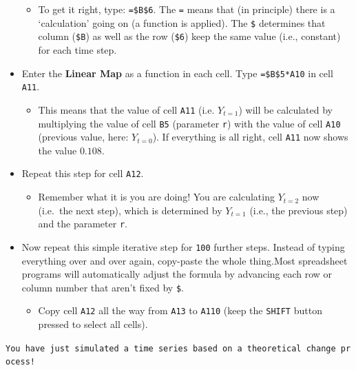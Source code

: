 \documentclass[]{book}
\providecommand{\tightlist}{%
  \setlength{\itemsep}{0pt}\setlength{\parskip}{0pt}}
\begin{document}
\begin{itemize}
  \begin{itemize}
  \tightlist
  \item
    To get it right, type: \texttt{=\$B\$6}. The \texttt{=} means that
    (in principle) there is a `calculation' going on (a function is
    applied). The \texttt{\$} determines that column (\texttt{\$B}) as
    well as the row (\texttt{\$6}) keep the same value (i.e., constant)
    for each time step.
  \end{itemize}
\item
  Enter the \textbf{Linear Map} as a function in each cell. Type
  \texttt{=\$B\$5*A10} in cell \texttt{A11}.

  \begin{itemize}
  \tightlist
  \item
    This means that the value of cell \texttt{A11} (i.e. \(Y_{t=1}\))
    will be calculated by multiplying the value of cell \texttt{B5}
    (parameter \texttt{r}) with the value of cell \texttt{A10} (previous
    value, here: \(Y_{t=0}\)). If everything is all right, cell
    \texttt{A11} now shows the value \(0.108\).
  \end{itemize}
\item
  Repeat this step for cell \texttt{A12}.

  \begin{itemize}
  \tightlist
  \item
    Remember what it is you are doing! You are calculating \(Y_{t=2}\)
    now (i.e.~the next step), which is determined by \(Y_{t=1}\) (i.e.,
    the previous step) and the parameter \texttt{r}.
  \end{itemize}
\item
  Now repeat this simple iterative step for \texttt{100} further steps.
  Instead of typing everything over and over again, copy-paste the whole
  thing.Most spreadsheet programs will automatically adjust the formula
  by advancing each row or column number that aren't fixed by
  \texttt{\$}.

  \begin{itemize}
  \tightlist
  \item
    Copy cell \texttt{A12} all the way from \texttt{A13} to
    \texttt{A110} (keep the \texttt{SHIFT} button pressed to select all
    cells).
  \end{itemize}
\end{itemize}

\texttt{You\ have\ just\ simulated\ a\ time\ series\ based\ on\ a\ theoretical\ change\ process!}
\end{document}
